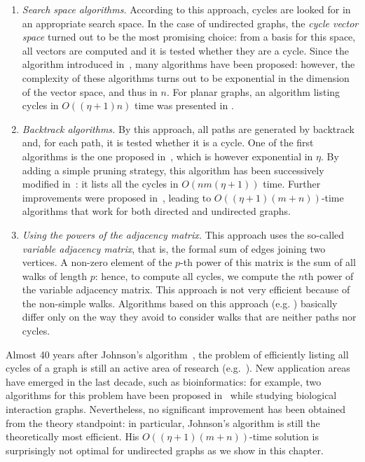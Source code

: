 \begin{enumerate}
\item \textit{Search space algorithms.}
According to this approach, cycles are looked for in an appropriate
search space.  In the case of undirected graphs, the \emph{cycle
vector space} \cite{Diestel} turned out to be the most promising
choice: from a basis for this space, all vectors are computed and it
is tested whether they are a cycle. Since the algorithm introduced
in~\cite{Welch66}, many algorithms have been proposed: however, the
complexity of these algorithms turns out to be exponential in the
dimension of the vector space, and thus in $n$. For planar graphs, an
algorithm listing cycles in $O((\eta + 1)n)$ time was presented in
\cite{Syslo81}.

\item \textit{Backtrack algorithms.} 
By this approach, all paths are generated by backtrack and, for each
path, it is tested whether it is a cycle. One of the first algorithms
is the one proposed in~\cite{Tiernan70}, which is however exponential
in $\eta$. By adding a simple pruning strategy, this algorithm has
been successively modified in~\cite{Tarjan73}: it lists all the cycles
in $O(nm(\eta+1))$ time. Further improvements were proposed
in~\cite{Johnson1975,Szwarcfiter76,Read75}, leading to
$O((\eta+1)(m+n))$-time algorithms that work for both directed and
undirected graphs. 


\item \textit{Using the powers of the adjacency matrix.} 
This approach uses the so-called \emph{variable adjacency matrix},
that is, the formal sum of edges joining two vertices. A non-zero
element of the $p$-th power of this matrix is the sum of all walks of
length $p$: hence, to compute all cycles, we compute the $n$th power
of the variable adjacency matrix. This approach is not very efficient
because of the non-simple walks. Algorithms based on this approach
(e.g.\mbox{} \cite{Ponstein66,Yau67}) basically differ only on the way
they avoid to consider walks that are neither paths nor cycles.
\end{enumerate}

Almost 40 years after Johnson's algorithm~\cite{Johnson1975}, the
problem of efficiently listing all cycles of a graph is still an
active area of research
(e.g.~\cite{birmele2012,Halford04,Horvath04,Liu06,Sankar07,Wild08,Schott11}).  New
application areas have emerged in the last decade, such as
bioinformatics: for example, two algorithms for this problem have been
proposed in~\cite{Klamt06,Klamt09} while studying
biological interaction graphs. Nevertheless, no significant
improvement has been obtained from the theory standpoint: in
particular, Johnson's algorithm is still the theoretically most
efficient. His $O((\eta+1)(m+n))$-time solution is surprisingly not
optimal for undirected graphs as we show in this chapter.

